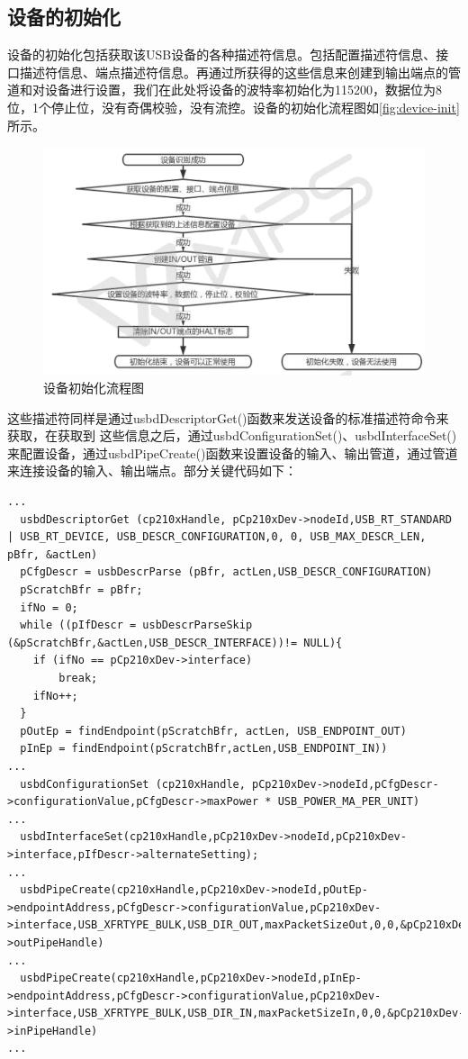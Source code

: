 	
	
	



\subsection{设备的初始化}

	设备的初始化包括获取该USB设备的各种描述符信息。包括配置描述符信息、接口描述符信息、端点描述符信息。再通过所获得的这些信息来创建到输出端点的管道和对设备进行设置，我们在此处将设备的波特率初始化为115200，数据位为8位，1个停止位，没有奇偶校验，没有流控。设备的初始化流程图如\autoref{fig:device-init}所示。
\begin{figure}[!h]
\centering
\includegraphics[width=1.0\textwidth]{./graphics/Dev-Init.pdf}
\caption{设备初始化流程图}\label{fig:device-init}
\end{figure}

这些描述符同样是通过usbdDescriptorGet()函数来发送设备的标准描述符命令来获取，在获取到
这些信息之后，通过usbdConfigurationSet()、usbdInterfaceSet()来配置设备，通过usbdPipeCreate()函数来设置设备的输入、输出管道，通过管道来连接设备的输入、输出端点。部分关键代码如下：
\lstset{language=C}
\begin{lstlisting}
...  
  usbdDescriptorGet (cp210xHandle, pCp210xDev->nodeId,USB_RT_STANDARD | USB_RT_DEVICE, USB_DESCR_CONFIGURATION,0, 0, USB_MAX_DESCR_LEN, pBfr, &actLen) 
  pCfgDescr = usbDescrParse (pBfr, actLen,USB_DESCR_CONFIGURATION)
  pScratchBfr = pBfr;
  ifNo = 0;
  while ((pIfDescr = usbDescrParseSkip (&pScratchBfr,&actLen,USB_DESCR_INTERFACE))!= NULL){
    if (ifNo == pCp210xDev->interface)
		break;
	ifNo++;
  }
  pOutEp = findEndpoint(pScratchBfr, actLen, USB_ENDPOINT_OUT)
  pInEp = findEndpoint(pScratchBfr,actLen,USB_ENDPOINT_IN))
...  
  usbdConfigurationSet (cp210xHandle, pCp210xDev->nodeId,pCfgDescr->configurationValue,pCfgDescr->maxPower * USB_POWER_MA_PER_UNIT)
...  
  usbdInterfaceSet(cp210xHandle,pCp210xDev->nodeId,pCp210xDev->interface,pIfDescr->alternateSetting);
...  
  usbdPipeCreate(cp210xHandle,pCp210xDev->nodeId,pOutEp->endpointAddress,pCfgDescr->configurationValue,pCp210xDev->interface,USB_XFRTYPE_BULK,USB_DIR_OUT,maxPacketSizeOut,0,0,&pCp210xDev->outPipeHandle)
...  
  usbdPipeCreate(cp210xHandle,pCp210xDev->nodeId,pInEp->endpointAddress,pCfgDescr->configurationValue,pCp210xDev->interface,USB_XFRTYPE_BULK,USB_DIR_IN,maxPacketSizeIn,0,0,&pCp210xDev->inPipeHandle)
...
\end{lstlisting}


